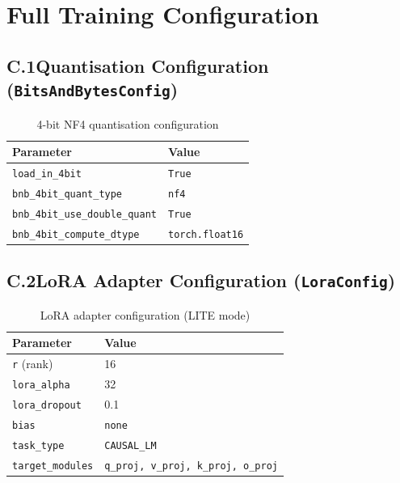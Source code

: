 \chapter{Full Training Configuration}
\label{app:training_config}

\section*{C.1\quad Quantisation Configuration (\texttt{BitsAndBytesConfig})}

\begin{table}[ht]
\centering
\caption{4-bit NF4 quantisation configuration}
\label{tab:bnb_config}
\begin{tabular}{ll}
\hline
\textbf{Parameter} & \textbf{Value} \\
\hline
\texttt{load\_in\_4bit}              & \texttt{True} \\
\texttt{bnb\_4bit\_quant\_type}      & \texttt{nf4} \\
\texttt{bnb\_4bit\_use\_double\_quant} & \texttt{True} \\
\texttt{bnb\_4bit\_compute\_dtype}   & \texttt{torch.float16} \\
\hline
\end{tabular}
\end{table}

\section*{C.2\quad LoRA Adapter Configuration (\texttt{LoraConfig})}

\begin{table}[ht]
\centering
\caption{LoRA adapter configuration (LITE mode)}
\label{tab:lora_full}
\begin{tabular}{ll}
\hline
\textbf{Parameter} & \textbf{Value} \\
\hline
\texttt{r} (rank)                    & 16 \\
\texttt{lora\_alpha}                 & 32 \\
\texttt{lora\_dropout}               & 0.1 \\
\texttt{bias}                        & \texttt{none} \\
\texttt{task\_type}                  & \texttt{CAUSAL\_LM} \\
\texttt{target\_modules}             & \texttt{q\_proj, v\_proj, k\_proj, o\_proj} \\
\hline
\end{tabular}
\end{table}

